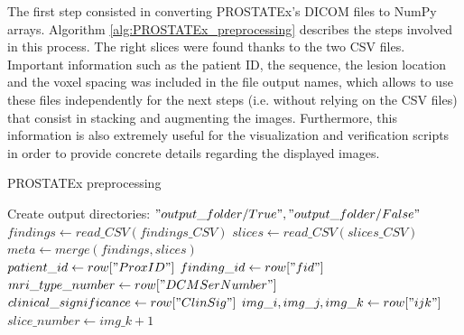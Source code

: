 The first step consisted in converting PROSTATEx's DICOM files to NumPy arrays. Algorithm \ref{alg:PROSTATEx_preprocessing} describes the steps involved in this process. The right slices were found thanks to the two CSV files. Important information such as the patient ID, the sequence, the lesion location and the voxel spacing was included in the file output names, which allows to use these files independently for the next steps (i.e. without relying on the CSV files) that consist in stacking and augmenting the images. Furthermore, this information is also extremely useful for the visualization and verification scripts in order to provide concrete details regarding the displayed images.

\begin{algorithm}
    \caption{PROSTATEx preprocessing}
    \label{alg:PROSTATEx_preprocessing}
    \begin{algorithmic}[1] %
        		\State Create output directories: $"output\_folder/True", "output\_folder/False"$\\
        		\State $findings \gets read\_CSV(findings\_CSV)$ 
        		\State $slices \gets read\_CSV(slices\_CSV)$ 
			\State $meta \gets merge(findings, slices)$\\
            		\State $patient\_id \gets row["ProxID"]$
            		\State $finding\_id \gets row["fid"]$
            		\State $mri\_type\_number \gets row["DCMSerNumber"]$
            		\State $clinical\_significance \gets row["ClinSig"]$
            		\State $img\_i, img\_j, img\_k \gets row["ijk"]$
            		\State $slice\_number \gets img\_k + 1$ \\
                						 
                					\EndIf
                				\EndFor
                			\EndIf
            			\EndFor
            		\EndFor
            \EndFor
        \EndProcedure
    \end{algorithmic}
\end{algorithm} 

